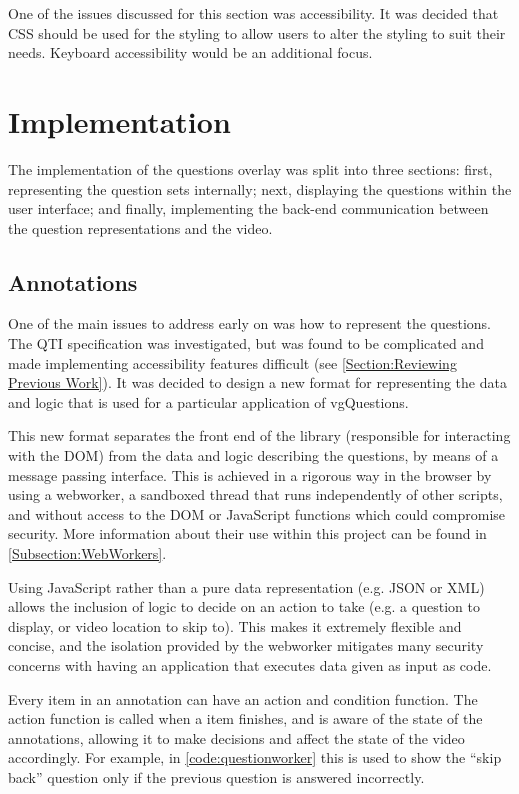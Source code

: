 One of the issues discussed for this section was accessibility. It was decided that \gls{CSS} should be used for the styling to allow users to alter the styling to suit their needs. Keyboard accessibility would be an additional focus.

\section{Implementation}
The implementation of the questions overlay was split into three sections: first, representing the question sets internally; next, displaying the questions within the user interface; and finally, implementing the back-end communication between the question representations and the video.

\subsection{Annotations}
\label{Section:Annotations}

One of the main issues to address early on was how to represent the questions. The \gls{QTI} specification was investigated, but was found to be complicated and made implementing accessibility features difficult (see \autoref{Section:Reviewing Previous Work}). It was decided to design a new format for representing the data and logic that is used for a particular application of \gls{vgQuestions}.

This new format separates the front end of the library (responsible for interacting with the \gls{DOM}) from the data and logic describing the questions, by means of a message passing interface. This is achieved in a rigorous way in the browser by using a \gls{webworker}, a sandboxed thread that runs independently of other scripts, and without access to the \gls{DOM} or JavaScript functions which could compromise security. More information about their use within this project can be found in \autoref{Subsection:WebWorkers}.

Using JavaScript rather than a pure data representation (e.g. JSON or XML) allows the inclusion of logic to decide on an action to take (e.g. a question to display, or video location to skip to). This makes it extremely flexible and concise, and the isolation provided by the \gls{webworker} mitigates many security concerns with having an application that executes data given as input as code.

Every item in an \gls{annotation} can have an action and condition function. The action function is called when a item finishes, and is aware of the state of the \glspl{annotation}, allowing it to make decisions and affect the state of the video accordingly. For example, in \autoref{code:questionworker} this is used to show the ``skip back'' question only if the previous question is answered incorrectly.


